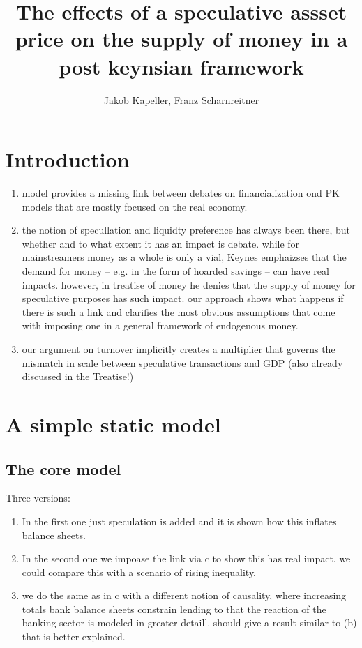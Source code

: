 \documentclass{article}
\author{Jakob Kapeller, Franz Scharnreitner}
\title{The effects of a speculative assset price on the supply of money in a post keynsian framework}
\begin{document}
\maketitle

\section{Introduction}

\begin{enumerate}[label=(\alph*)]
\item model provides a missing link between debates on financialization ond PK models that are mostly focused on the real economy.
\item the notion of specullation and liquidty preference has always been there, but whether and to what extent it has an impact is debate. while for mainstreamers money as a whole is only a vial, Keynes emphaizses that the demand for money –  e.g. in the form of hoarded savings – can have real impacts. however, in treatise of money he denies that the supply of money for speculative purposes has such impact. our approach shows what happens if there is such a link and clarifies the most obvious assumptions that come with imposing one in a general framework of endogenous money.
\item our argument on turnover implicitly creates a multiplier that governs the mismatch in scale between speculative transactions and GDP (also already discussed in the Treatise!)
\end{enumerate}
\section{A simple static model}

\subsection{The core model}


Three versions:

\begin{enumerate}[label=(\alph*)]
  \item  In the first one just speculation is added and it is shown how this inflates balance sheets.
  \item  In the second one we impoase the link via c to show this has real impact. we could compare this with a scenario of rising inequality.
  \item  we do the same as in c with a different notion of causality,
where increasing totals bank balance sheets constrain lending to that the reaction of the banking sector is modeled in greater detaill. should give a result similar to (b) that is better explained.
\end{enumerate}
\end{document}
